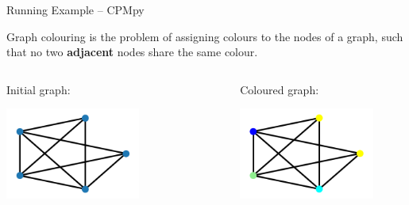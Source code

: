\documentclass{cons-beamer}
\begin{document}
\begin{flashcardcpmpy}
\begin{frame}{Running Example -- CPMpy}
  \begin{example}
    \footnotesize	
    Graph colouring is the problem of assigning colours to the nodes of a graph, such that no two \textbf{adjacent} nodes share the same colour. 

    \footnotesize    
  \end{example}

  \vspace{-0.4cm}
  \footnotesize	
  \begin{columns}
    \begin{column}{0.45\textwidth}
      \begin{center}
        Initial graph:

        \includegraphics[height=30mm]{images/texpl_img/graph_not_coloured.png}
      \end{center}
    \end{column}
    \begin{column}{0.1\textwidth}
      \begin{center}
      \end{center}
    \end{column}
    \begin{column}{0.45\textwidth}
      \begin{center}
        Coloured graph:

        \includegraphics[height=30mm]{images/texpl_img/graph_coloured.png}
      \end{center}    
    \end{column}
  \end{columns}
\end{frame}
\end{flashcardcpmpy}
\end{document}

